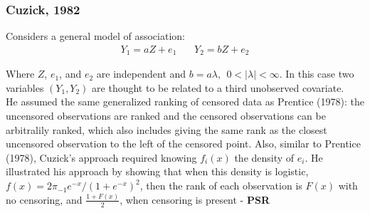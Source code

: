 \documentclass[]{article}
\begin{document}
\subsubsection{Cuzick, 1982}
Considers a general model of association:
	$$
	\begin{aligned}
		Y_1 = aZ + e_1 ~~~~~~~~ Y_2 = bZ + e_2
	\end{aligned}
	$$

Where $Z$, $e_1$, and $e_2$ are independent and  $b=a\lambda,~~0<|\lambda|<\infty$. In this case two variables $(Y_1, Y_2)$ are thought to be related to a third unobserved covariate.\\
He assumed the same generalized ranking of censored data as Prentice (1978): the uncensored observations are ranked and the censored observations can be arbitralily ranked, which also includes giving the same rank as the closest uncensored observation to the left of the censored point. Also, similar to Prentice (1978), Cuzick's approach required knowing $f_i(x)$ the density of $e_i$. He illustrated his approach by showing that when this density is logistic, $f(x) = 2\pi_{-1} e^{-x}/(1+e^{-x})^2$, then the rank of each observation is $F(x)$ with no censoring, and $\frac{1+F(x)}{2}$, when censoring is present - \textbf{PSR}
\end{document}
